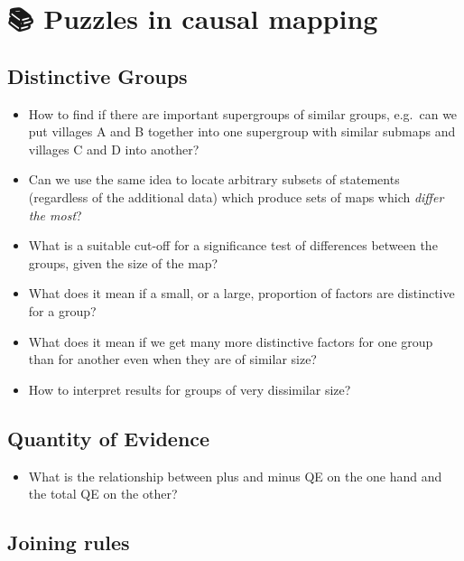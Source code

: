 \documentclass[
]{book}
\providecommand{\tightlist}{%
  \setlength{\itemsep}{0pt}\setlength{\parskip}{0pt}}
\begin{document}
\hypertarget{puzzles-in-causal-mapping}{%
\chapter{📚 Puzzles in causal mapping}\label{puzzles-in-causal-mapping}}

\hypertarget{distinctive-groups}{%
\section{Distinctive Groups}\label{distinctive-groups}}

\begin{itemize}
\item
  How to find if there are important supergroups of similar groups, e.g.~can we put villages A and B together into one supergroup with similar submaps and villages C and D into another?
\item
  Can we use the same idea to locate arbitrary subsets of statements (regardless of the additional data) which produce sets of maps which \emph{differ the most}?
\item
  What is a suitable cut-off for a significance test of differences between the groups, given the size of the map?
\item
  What does it mean if a small, or a large, proportion of factors are distinctive for a group?
\item
  What does it mean if we get many more distinctive factors for one group than for another even when they are of similar size?
\item
  How to interpret results for groups of very dissimilar size?
\end{itemize}

\hypertarget{quantity-of-evidence}{%
\section{Quantity of Evidence}\label{quantity-of-evidence}}

\begin{itemize}
\tightlist
\item
  What is the relationship between plus and minus QE on the one hand and the total QE on the other?
\end{itemize}

\hypertarget{joining-rules}{%
\section{Joining rules}\label{joining-rules}}
\end{document}
